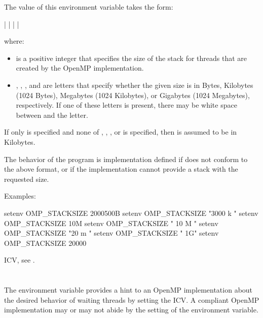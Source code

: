 The value of this environment variable takes the form:

 |  |  |  | 

where:

\begin{itemize}
\item {} is a positive integer that specifies the size of the
      stack for threads that are created by the OpenMP implementation.
\item {}, , , and  are letters that specify
      whether the given size is in Bytes, Kilobytes (1024 Bytes), Megabytes
      (1024 Kilobytes), or Gigabytes (1024 Megabytes), respectively. If
      one of these letters is present, there may be white space between
       and the letter.
\end{itemize}

If only  is specified and none of , , ,
or  is specified, then  is assumed to be in Kilobytes.

The behavior of the program is implementation defined if 
does not conform to the above format, or if the implementation cannot provide
a stack with the requested size.

Examples:
\begin{ompEnv}
setenv OMP_STACKSIZE 2000500B
setenv OMP_STACKSIZE "3000 k "
setenv OMP_STACKSIZE 10M
setenv OMP_STACKSIZE " 10 M "
setenv OMP_STACKSIZE "20 m "
setenv OMP_STACKSIZE " 1G"
setenv OMP_STACKSIZE 20000
\end{ompEnv}

\begin{crossrefs}
\item {} ICV, see .
\end{crossrefs}



\section{}
\label{sec:OMP_WAIT_POLICY}
The  environment variable provides a hint to an OpenMP
implementation about the desired behavior of waiting threads by setting the
 ICV. A compliant OpenMP implementation may or may not
abide by the setting of the environment variable.

